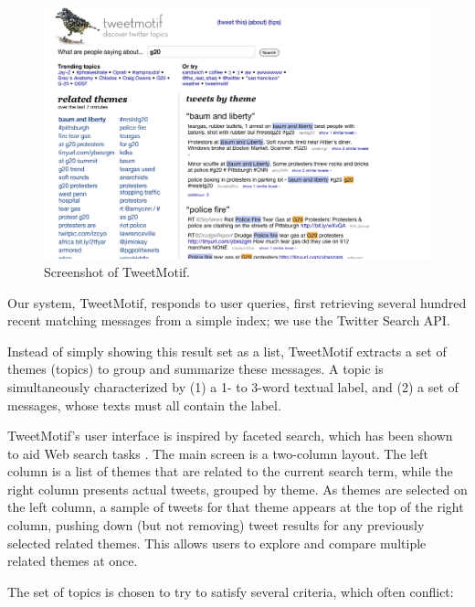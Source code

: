 \documentclass[letterpaper]{article}
\begin{document}
\begin{figure}[htbp]
\begin{center}
\includegraphics[scale=0.3]{screenshot.png}
\caption{Screenshot of TweetMotif.}
\label{screenshot}
\end{center}
\end{figure}

Our system, TweetMotif, responds to user queries, first retrieving several hundred recent matching messages from a simple index; we use the Twitter Search API.

Instead of simply showing this result set as a list, TweetMotif extracts a set of themes (topics) to group and summarize these messages.  A topic is simultaneously characterized by (1) a 1- to 3-word textual label, and (2) a set of messages, whose texts must all contain the label.

TweetMotif's user interface is inspired by faceted search, which has been shown to aid Web search tasks \cite{hearst_findingflow_2002}.
The main screen is a two-column layout. The left column is a list of themes that are related to the current search term, while the right column presents actual tweets, grouped by theme. As themes are selected on the left column, a sample of tweets for that theme appears at the top of the right column, pushing down (but not removing) tweet results for any previously selected related themes. This allows users to explore and compare multiple related themes at once. 

The set of topics is chosen to try to satisfy several criteria, which often conflict:
\end{document}

